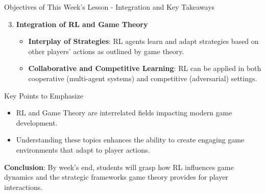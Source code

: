 \documentclass[aspectratio=169]{beamer}
\begin{document}
\begin{frame}[fragile]{Objectives of This Week's Lesson - Integration and Key Takeaways}
    \begin{enumerate}
        \setcounter{enumi}{2} %
        \item \textbf{Integration of RL and Game Theory}
            \begin{itemize}
                \item \textbf{Interplay of Strategies}: RL agents learn and adapt strategies based on other players' actions as outlined by game theory.
                \item \textbf{Collaborative and Competitive Learning}: RL can be applied in both cooperative (multi-agent systems) and competitive (adversarial) settings.
            \end{itemize}
    \end{enumerate}
    
    \begin{block}{Key Points to Emphasize}
        \begin{itemize}
            \item RL and Game Theory are interrelated fields impacting modern game development.
            \item Understanding these topics enhances the ability to create engaging game environments that adapt to player actions.
        \end{itemize}
    \end{block}

    \textbf{Conclusion}: By week's end, students will grasp how RL influences game dynamics and the strategic frameworks game theory provides for player interactions.
\end{frame}
\end{document}
